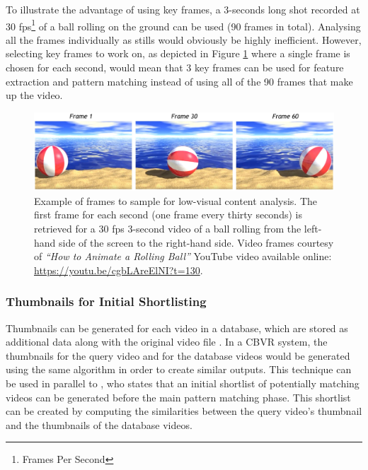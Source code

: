 To illustrate the advantage of using key frames, a 3-seconds long shot recorded at 30 fps\footnote{Frames Per Second} of a ball rolling on the ground can be used (90 frames in total). Analysing all the frames individually as stills would obviously be highly inefficient. However, selecting key frames to work on, as depicted in Figure \ref{fig:rolling_ball} where a single frame is chosen for each second, would mean that 3 key frames can be used for feature extraction and pattern matching instead of using all of the 90 frames that make up the video.\\

\begin{figure}[h]
\centerline{\includegraphics[width=\textwidth]{figures/litsurvey/ball_rolling.jpg}}
\caption{\label{fig:rolling_ball}Example of frames to sample for low-visual content analysis. The first frame for each second (one frame every thirty seconds) is retrieved for a 30 fps 3-second video of a ball rolling from the left-hand side of the screen to the right-hand side. Video frames courtesy of \textit{``How to Animate a Rolling Ball''} YouTube video available online: \url{https://youtu.be/cgbLAreElNI?t=130}.}
\end{figure}

\subsubsection{Thumbnails for Initial Shortlisting}

Thumbnails can be generated for each video in a database, which are stored as additional data along with the original video file \cite{okabe2018animating}. In a CBVR system, the thumbnails for the query video and for the database videos would be generated using the same algorithm in order to create similar outputs. This technique can be used in parallel to \cite{araujo2017i2v}, who states that an initial shortlist of potentially matching videos can be generated before the main pattern matching phase. This shortlist can be created by computing the similarities between the query video's thumbnail and the thumbnails of the database videos.\\

